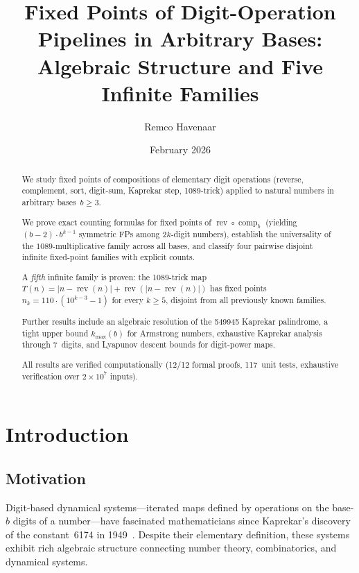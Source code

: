\documentclass[11pt,a4paper]{amsart}
\title[Fixed Points of Digit-Operation Pipelines]{Fixed Points of Digit-Operation Pipelines in Arbitrary Bases:\\
Algebraic Structure and Five Infinite Families}
\author{Remco Havenaar}
\date{February 2026}
\theoremstyle{plain}
\theoremstyle{definition}
\theoremstyle{remark}
\DeclareMathOperator{\rev}{rev}
\DeclareMathOperator{\comp}{comp}
\begin{document}
\begin{abstract}
We study fixed points of compositions of elementary digit operations
(reverse, complement, sort, digit-sum, Kaprekar step, 1089-trick)
applied to natural numbers in arbitrary bases~$b \geq 3$.

We prove exact counting formulas for fixed points of
$\rev \circ \comp_b$ (yielding $(b{-}2) \cdot b^{k-1}$ symmetric FPs
among $2k$-digit numbers), establish the universality of the
$1089$-multiplicative family across all bases, and classify four
pairwise disjoint infinite fixed-point families with explicit counts.

A \emph{fifth} infinite family is proven: the 1089-trick map $T(n) =
|n - \rev(n)| + \rev(|n - \rev(n)|)$ has fixed points
$n_k = 110 \cdot (10^{k-3} - 1)$ for every $k \geq 5$, disjoint from
all previously known families.

Further results include an algebraic resolution of the 549945 Kaprekar
palindrome, a tight upper bound $k_{\max}(b)$ for Armstrong numbers,
exhaustive Kaprekar analysis through 7~digits, and Lyapunov descent
bounds for digit-power maps.

All results are verified computationally (12/12 formal proofs, 117~unit
tests, exhaustive verification over $2 \times 10^7$ inputs).
\end{abstract}

\maketitle

\section{Introduction}\label{sec:intro}

\subsection{Motivation}
Digit-based dynamical systems---iterated maps defined by operations on the
base-$b$ digits of a number---have fascinated mathematicians since Kaprekar's
discovery of the constant~6174 in 1949~\cite{Kaprekar1955}. Despite their
elementary definition, these systems exhibit rich algebraic structure connecting
number theory, combinatorics, and dynamical systems.
\end{document}
